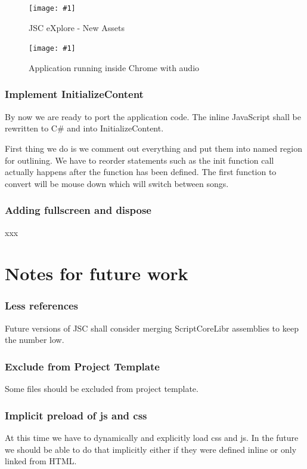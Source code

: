 \documentclass[12pt,leqno]{book}
\newcommand{\png}[1]{\texttt{[image: \#1]}}
\newcommand{\figpng}[2]{\begin{figure}[htb]\centering\png{#1}\caption{#2}\end{figure}}
\begin{document}
\figpng{Images/eXplore-2012-03-31_13.48.45}
{JSC eXplore - New Assets}

\figpng{Images/A_string_from_JavaScript._-_Google_Chrome-2012-03-31_13.54.10}
{Application running inside Chrome with audio}

\subsection{Implement InitializeContent}
By now we are ready to port the application code. The inline JavaScript shall be rewritten to C# and into InitializeContent.

First thing we do is we comment out everything and put them into named region for outlining. We have to reorder statements such as the init function call actually happens after the function has been defined. The first function to convert will be mouse down which will switch between songs.


\subsection{Adding fullscreen and dispose}
xxx




\chapter{Notes for future work}

\subsection{Less references}
Future versions of JSC shall consider merging ScriptCoreLibr assemblies to keep the number low.

\subsection{Exclude from Project Template}
Some files should be excluded from project template. 

\subsection{Implicit preload of js and css}
At this time we have to dynamically and explicitly load css and js. In the future we should
be able to do that implicitly either if they were defined inline or only linked from HTML.
\end{document}
